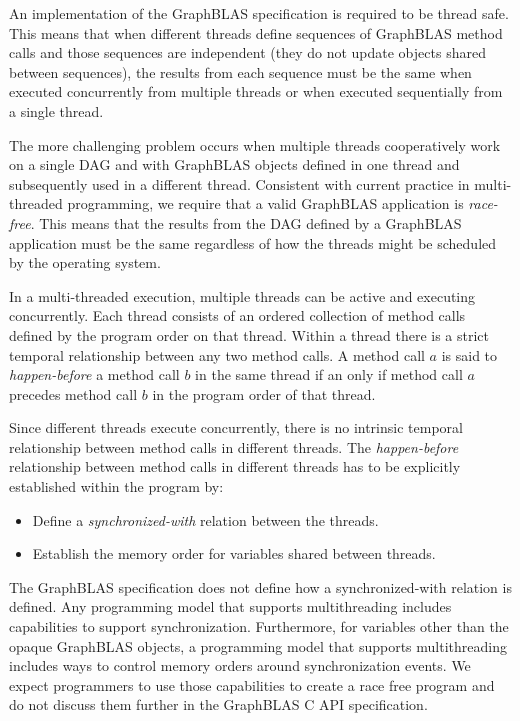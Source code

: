 An implementation of the GraphBLAS specification is required to be {thread safe}.  This means
that when different threads define sequences of GraphBLAS method calls and those sequences
are independent (they do not update objects shared between sequences), the results from each sequence must 
be the same when executed concurrently from multiple threads or when executed sequentially from a single thread.

The more challenging problem occurs when multiple threads cooperatively work on a single DAG and with
GraphBLAS objects defined in one thread and subsequently used in a different thread.  Consistent
with current practice in multi-threaded programming, we require that a valid GraphBLAS application
is \emph{race-free}.  This means that the results from the DAG defined by a GraphBLAS application
must be the same regardless of how the threads might be scheduled by the operating system.

In a multi-threaded execution, multiple threads can be active and
executing concurrently. Each thread consists of an ordered collection
of method calls defined by the program order on that thread.  Within a
thread there is a strict temporal relationship between any two method
calls. A method call $a$ is said to \emph{happen-before} a method call $b$
in the same thread if an only if method call $a$ precedes method call $b$
in the program order of that thread.

Since different threads execute concurrently, there is no intrinsic
temporal relationship between method calls in different threads.
The \emph{happen-before} relationship between method calls  in different
threads has to be explicitly established within the program by:
\begin{itemize}

\item Define a \emph{synchronized-with} relation between the threads.
\item Establish the memory order for variables shared between threads.

\end{itemize}

The GraphBLAS specification does not define how a synchronized-with relation
is defined.  Any programming model that supports multithreading includes 
capabilities to support synchronization.  Furthermore, for variables other than
the opaque GraphBLAS objects, a programming model that supports multithreading 
includes ways to control memory orders around synchronization events.  We
expect programmers to use those capabilities to create a race free program and do not
discuss them further in the GraphBLAS C API specification.

